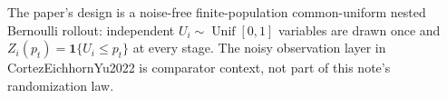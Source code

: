 The paper's design is a noise-free finite-population common-uniform nested Bernoulli rollout: independent \(U_i\sim\operatorname{Unif}[0,1]\) variables are drawn once and \(Z_i(p_t)=\mathbf1\{U_i\le p_t\}\) at every stage.  The noisy observation layer in CortezEichhornYu2022 is comparator context, not part of this note's randomization law.
